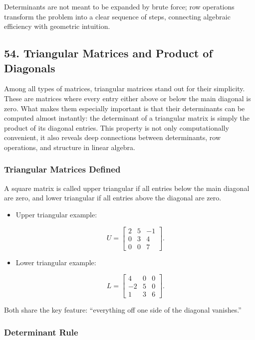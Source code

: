 \documentclass[
  letterpaper,
  DIV=11,
  numbers=noendperiod]{scrreprt}
\begin{document}
Determinants are not meant to be expanded by brute force; row operations
transform the problem into a clear sequence of steps, connecting
algebraic efficiency with geometric intuition.

\subsection{54. Triangular Matrices and Product of
Diagonals}\label{triangular-matrices-and-product-of-diagonals}

Among all types of matrices, triangular matrices stand out for their
simplicity. These are matrices where every entry either above or below
the main diagonal is zero. What makes them especially important is that
their determinants can be computed almost instantly: the determinant of
a triangular matrix is simply the product of its diagonal entries. This
property is not only computationally convenient, it also reveals deep
connections between determinants, row operations, and structure in
linear algebra.

\subsubsection{Triangular Matrices
Defined}\label{triangular-matrices-defined}

A square matrix is called upper triangular if all entries below the main
diagonal are zero, and lower triangular if all entries above the
diagonal are zero.

\begin{itemize}
\item
  Upper triangular example:

  \[
  U = \begin{bmatrix} 
  2 & 5 & -1 \\ 
  0 & 3 & 4 \\ 
  0 & 0 & 7 
  \end{bmatrix}.
  \]
\item
  Lower triangular example:

  \[
  L = \begin{bmatrix} 
  4 & 0 & 0 \\ 
  -2 & 5 & 0 \\ 
  1 & 3 & 6 
  \end{bmatrix}.
  \]
\end{itemize}

Both share the key feature: ``everything off one side of the diagonal
vanishes.''

\subsubsection{Determinant Rule}\label{determinant-rule}
\end{document}
